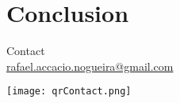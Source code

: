 \documentclass[aspectratio=169]{audition-beamer}
\begin{document}

\section{Conclusion}


\begin{frame}[plain]
  \centering
  \vfill
  \begin{minipage}[t]{.5\linewidth}
    \small
    \centering
    Contact\\
    \href{mailto:rafael.accacio.nogueira@gmail.com?subject=Audition IMT-Atlantique 2024}{rafael.accacio.nogueira@gmail.com}

    \texttt{[image: qrContact.png]}
  \end{minipage}
  \fi
\end{frame}

\appendix
\end{document}
